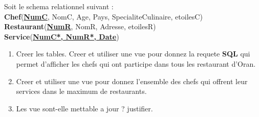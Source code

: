 Soit le schema relationnel suivant :\\[0.15cm]
\textbf{Chef}(\textbf{\underline{NumC}}, NomC, Age, Pays, SpecialiteCulinaire, etoilesC)\\[0.1cm]
\textbf{Restaurant}(\textbf{\underline{NumR}}, NomR, Adresse, etoilesR)\\[0.1cm]
\textbf{Service}(\textbf{\underline{NumC*, NumR*, Date}})\\[0.1cm]

\begin{enumerate}
    \item Creer les tables.
    \itme Creer et utiliser une vue pour donnez la requete \textbf{SQL} qui permet d'afficher les chefs qui ont participe dans tous les restaurant d'Oran.
    \item Creer et utiliser une vue pour donnez l'ensemble des chefs qui offrent leur services dans le maximum de restaurants.
    \item Les vue sont-elle mettable a jour ? justifier.
\end{enumerate}
